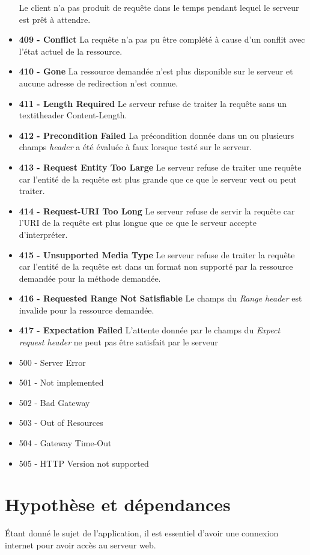 \documentclass{scrreprt}
\begin{document}
\begin{itemize}
 \subitem Le client n'a pas produit de requête dans le temps pendant lequel le serveur est prêt à attendre.
 \item \textbf{409 - Conflict}
 \subitem La requête n'a pas pu être complété à cause d'un conflit avec l'état actuel de la ressource.
 \item \textbf{410 - Gone}
 \subitem La ressource demandée n'est plus disponible sur le serveur et aucune adresse de redirection n'est connue.
 \item \textbf{411 - Length Required}
 \subitem Le serveur refuse de traiter la requête sans un textit{header} Content-Length.
 \item \textbf{412 - Precondition Failed}
 \subitem La précondition donnée dans un ou plusieurs champs \textit{header} a été évaluée à faux lorsque testé sur le serveur.
 \item \textbf{413 - Request Entity Too Large}
 \subitem Le serveur refuse de traiter une requête car l'entité de la requête est plus grande que ce que le serveur veut ou peut traiter.
 \item \textbf{414 - Request-URI Too Long}
 \subitem Le serveur refuse de servir la requête car l'URI de la requête est plus longue que ce que le serveur accepte d'interpréter.
 \item \textbf{415 - Unsupported Media Type}
 \subitem Le serveur refuse de traiter la requête car l'entité de la requête est dans un format non supporté par la ressource demandée pour la méthode demandée.
 \item \textbf{416 - Requested Range Not Satisfiable}
 \subitem Le champs du \textit{Range header} est invalide pour la ressource demandée.
 \item \textbf{417 - Expectation Failed}
 \subitem L'attente donnée par le champs du \textit{Expect request header} ne peut pas être satisfait par le serveur
 \item 500 - Server Error
 \subitem 

 \item 501 - Not implemented
 \item 502 - Bad Gateway
 \item 503 - Out of Resources
 \item 504 - Gateway Time-Out
 \item 505 - HTTP Version not supported

 \end{itemize}

 
    
\section{Hypothèse et dépendances}
Étant donné le sujet de l'application, il est essentiel d'avoir une connexion internet pour avoir accès au serveur web.\\
\end{document}
